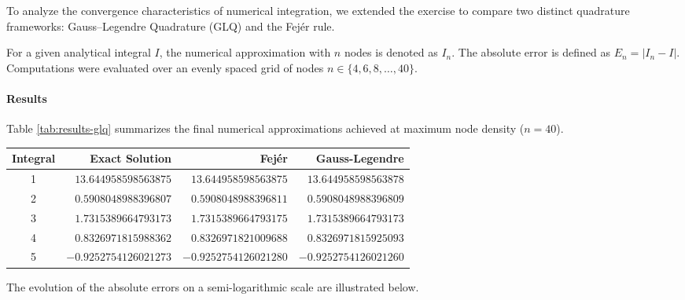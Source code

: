 \begin{solution}

	To analyze the convergence characteristics of numerical integration, we
	extended the exercise to compare two distinct quadrature frameworks:
	Gauss--Legendre Quadrature (GLQ) and the Fejér rule.

	For a given analytical integral $I$, the numerical approximation with $n$
	nodes is denoted as $I_n$. The absolute error is defined as $E_n = |I_n - I|$.
	Computations were evaluated over an evenly spaced grid of nodes $n \in \{4, 6,
		8, \dots, 40\}$.

	\paragraph{Results}
	Table \ref{tab:results-glq} summarizes the final numerical approximations
	achieved at maximum node density ($n=40$).

	\begin{center}
		\centering
		\label{tab:results-glq}
		\renewcommand{\arraystretch}{1.2}
		\begin{tabular}{c r r r}
			\toprule
			Integral & Exact Solution        & Fejér                 & Gauss-Legendre        \\
			\midrule
			1        & $13.644958598563875$  & $13.644958598563875$  & $13.644958598563878$  \\
			2        & $0.5908048988396807$  & $0.5908048988396811$  & $0.5908048988396809$  \\
			3        & $1.7315389664793173$  & $1.7315389664793175$  & $1.7315389664793173$  \\
			4        & $0.8326971815988362$  & $0.8326971821009688$  & $0.8326971815925093$  \\
			5        & $-0.9252754126021273$ & $-0.9252754126021280$ & $-0.9252754126021260$ \\
			\bottomrule
		\end{tabular}
	\end{center}

	The evolution of the absolute errors on a semi-logarithmic scale are illustrated below.


\end{solution}
